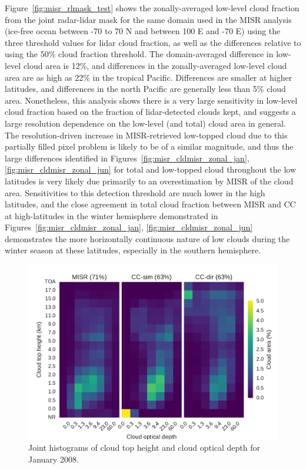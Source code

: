 Figure~\ref{fig:misr_rlmask_test} shows the zonally-averaged low-level
cloud fraction from the joint radar-lidar mask for the same domain used
in the MISR analysis (ice-free ocean between -70 to 70 N and between 100
E and -70 E) using the three threshold values for lidar cloud fraction,
as well as the differences relative to using the 50\% cloud fraction
threshold. The domain-averaged difference in low-level cloud area is
12\%, and differences in the zonally-averaged low-level cloud area are
as high as 22\% in the tropical Pacific. Differences are smaller at
higher latitudes, and differences in the north Pacific are generally
less than 5\% cloud area. Nonetheless, this analysis shows there is a
very large sensitivity in low-level cloud fraction based on the fraction
of lidar-detected clouds kept, and suggests a large resolution
dependence on the low-level (and total) cloud area in general. The
resolution-driven increase in MISR-retrieved low-topped cloud due to
this partially filled pixel problem is likely to be of a similar
magnitude, and thus the large differences identified in
Figures~\ref{fig:misr_cldmisr_zonal_jan}, \ref{fig:misr_cldmisr_zonal_jun}
for total and low-topped cloud throughout the low latitudes is very
likely due primarily to an overestimation by MISR of the cloud area.
Sensitivities to this detection threshold are much lower in the high
latitudes, and the close agreement in total cloud fraction between MISR
and CC at high-latitudes in the winter hemisphere demonstrated in
Figures~\ref{fig:misr_cldmisr_zonal_jan}, \ref{fig:misr_cldmisr_zonal_jun}
demonstrates the more horizontally continuous nature of low clouds
during the winter season at these latitudes, especially in the southern
hemisphere.

\begin{figure}[htbp]
\centering
\includegraphics{graphics/misr_clmisr_Pacific_2008-01.pdf}
\caption{\label{fig:misr_cthtau_Pacific_january}Joint histograms of
cloud top height and cloud optical depth for January
2008.}\label{fig:misrux5fcthtauux5fPacificux5fjanuary}
\end{figure}

